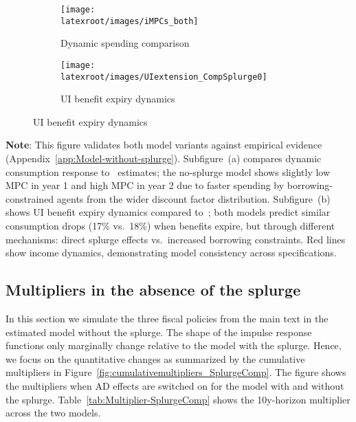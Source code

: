 \documentclass[qe]{econsocart}
\begin{document}
\begin{figure}[H]
  \centering
  \caption{Validation moments in models with and without splurge}
  \label{fig:untargetedMoments_wSplZero} 
    \centering
    \begin{subfigure}[b]{0.48\textwidth}
      \centering
      \texttt{[image: \\latexroot/images/iMPCs\_both]}
      \caption{Dynamic spending comparison}
      \label{fig:USaggmpclotterywin_wSplZero} 
    \end{subfigure}
    \begin{subfigure}[b]{0.48\textwidth}
      \centering
      \texttt{[image: \\latexroot/images/UIextension\_CompSplurge0]}
      \caption{UI benefit expiry dynamics}
      \label{fig:expiryUI_wSplZero} 
    \end{subfigure}
\end{figure}
\noindent\parbox{\textwidth}{\footnotesize
  \textbf{Note}: This figure validates both model variants against empirical evidence (Appendix~\ref{app:Model-without-splurge}).
  Subfigure~(a) compares dynamic consumption response to~\cite{fagereng-mpc-2021} estimates;
  the no-splurge model shows slightly low MPC in year 1 and high MPC in year 2 due to
  faster spending by borrowing-constrained agents from the wider discount factor distribution.
  Subfigure~(b) shows UI benefit expiry dynamics compared to~\cite{ganongConsumer2019};
  both models predict similar consumption drops (17\% vs.\ 18\%) when benefits expire,
  but through different mechanisms: direct splurge effects vs.\ increased borrowing constraints.
  Red lines show income dynamics, demonstrating model consistency across specifications.
}

\vspace{2em}  %

\subsection{Multipliers in the absence of the splurge}
\label{app:nosplurge-multipliers} 

In this section we simulate the three fiscal policies from the main text in the estimated model without the splurge. The shape of the impulse response functions only marginally change relative to the model with the splurge. Hence, we focus on the quantitative changes as summarized by the cumulative multipliers in Figure~\ref{fig:cumulativemultipliers_SplurgeComp}.
The figure shows the multipliers when AD effects are switched on for the model with and without the splurge.
Table~\ref{tab:Multiplier-SplurgeComp} shows the 10y-horizon multiplier across the two models.
\end{document}
